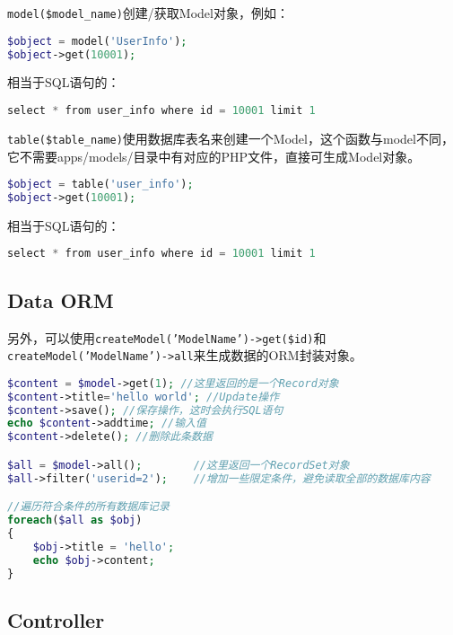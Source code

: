 \texttt{model(\$model\_name)}创建/获取Model对象，例如：

\begin{lstlisting}[language=PHP]
$object = model('UserInfo');
$object->get(10001);
\end{lstlisting}

相当于SQL语句的：

\begin{lstlisting}[language=PHP]
select * from user_info where id = 10001 limit 1
\end{lstlisting}


\texttt{table(\$table\_name)}使用数据库表名来创建一个Model，这个函数与model不同，它不需要apps/models/目录中有对应的PHP文件，直接可生成Model对象。

\begin{lstlisting}[language=PHP]
$object = table('user_info');
$object->get(10001);
\end{lstlisting}

相当于SQL语句的：


\begin{lstlisting}[language=PHP]
select * from user_info where id = 10001 limit 1
\end{lstlisting}


\subsection{Data ORM}


另外，可以使用\texttt{createModel('ModelName')->get(\$id)}和\texttt{createModel('ModelName')->all}来生成数据的ORM封装对象。


\begin{lstlisting}[language=PHP]
$content = $model->get(1); //这里返回的是一个Record对象
$content->title='hello world'; //Update操作
$content->save(); //保存操作，这时会执行SQL语句
echo $content->addtime; //输入值
$content->delete(); //删除此条数据

$all = $model->all();        //这里返回一个RecordSet对象
$all->filter('userid=2');    //增加一些限定条件，避免读取全部的数据库内容

//遍历符合条件的所有数据库记录
foreach($all as $obj)
{
    $obj->title = 'hello';
    echo $obj->content;
}
\end{lstlisting}


\subsection{Controller}




